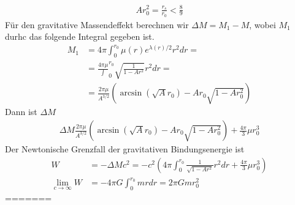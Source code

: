 \documentclass[a4paper]{article}
\begin{document}
\begin{align}
    Ar_0^2 = \frac{r_s}{r_0} < \frac{8}{9}
\end{align}
Für den gravitative Massendeffekt berechnen wir $\Delta M= M_1 -M$, wobei
$M_1$ durhc das folgende Integral gegeben ist.
\begin{align}
    M_1 &= 4\pi \int _0^{r_0}\mu(r) e^{\lambda(r)/2}r^2 dr =\\
    &= \frac{4\pi\mu} \int_0^{r_0} \sqrt{\frac{1}{1-Ar^2}} r^2 dr= \\
    &= \frac{2\pi\mu}{A^{3/2}} (\arcsin(\sqrt{A}r_0) -Ar_0\sqrt{1-Ar_0^2})
\end{align}
Dann ist $\Delta M$
\begin{align}
    \Delta M \frac{2\pi\mu}{A^{3/2}} (\arcsin(\sqrt{A}r_0)
    -Ar_0\sqrt{1-Ar_0^2})  + \frac{4\pi}{3} \mu r_0^3
\end{align}
Der Newtonische Grenzfall der gravitativen Bindungsenergie ist
\begin{align}
    W &= -\Delta M c^2 = -c^2(4\pi\int _0^{r_0} \frac{1}{\sqrt{1-Ar^2}} r^2
    dr + \frac{4\pi}{3} \mu r^3_0) \\
    \lim_{c\rightarrow \infty} W &= -4\pi G \int_0^{r_0} m rdr
    = 2\pi Gmr_0^2
\end{align}
=======
\end{document}
